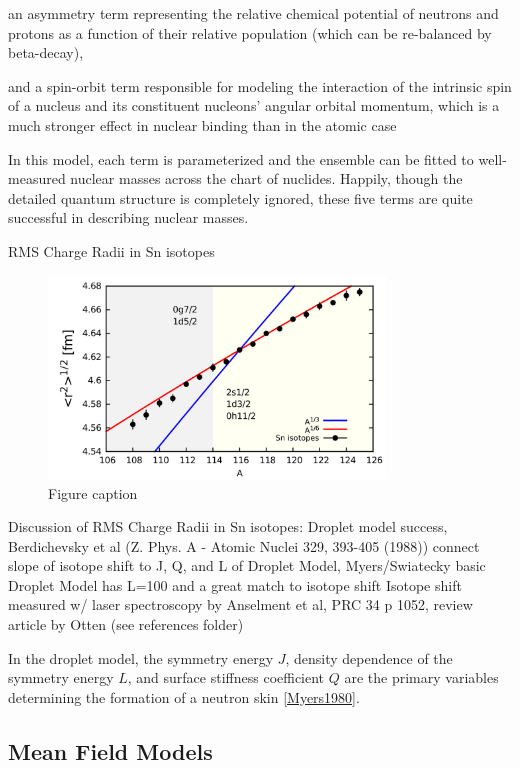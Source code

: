 an asymmetry term representing the relative chemical potential of neutrons and
protons as a function of their relative population (which can be re-balanced by
beta-decay),

and a spin-orbit term responsible for modeling the interaction of the intrinsic spin
of a nucleus and its constituent nucleons' angular orbital momentum, which is
a much stronger effect in nuclear binding than in the atomic case

In this model, each term is parameterized and the ensemble can be fitted to
well-measured nuclear masses across the chart of nuclides. Happily, though the detailed
quantum structure is completely ignored, these five terms are quite successful
in describing nuclear masses.

RMS Charge Radii in Sn isotopes

\cite{MyersAndSwiatecki}

\begin{figure}
    \includegraphics[width=0.8\textwidth]{figures/SnIsotopeRMSRadii.png}
    \caption{Figure caption}
    \label{SnIsotopeShift}
\end{figure}

Discussion of RMS Charge Radii in Sn isotopes: Droplet model success,
Berdichevsky et al (Z. Phys. A - Atomic Nuclei 329, 393-405 (1988)) connect
slope of isotope shift to J, Q, and L of Droplet Model, Myers/Swiatecky basic
Droplet Model has L=100 and a great match to isotope shift
Isotope shift measured w/ laser spectroscopy by Anselment et al, PRC 34 p 1052,
review article by Otten (see references folder)

In the droplet model, the symmetry energy $J$, density dependence of the symmetry energy
$L$, and surface stiffness coefficient $Q$ are the primary variables determining the formation of a 
neutron skin \ref{Myers1980}.

\subsection{Mean Field Models}

